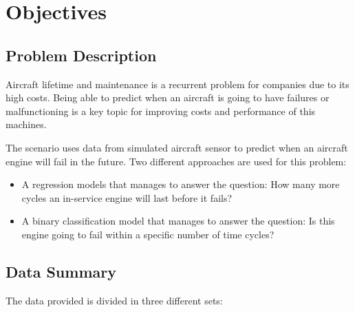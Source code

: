 
\chapter{Objectives} %

\label{Chapter1} %


\newcommand{\keyword}[1]{\textbf{#1}}
\newcommand{\tabhead}[1]{\textbf{#1}}
\newcommand{\code}[1]{\texttt{#1}}
\newcommand{\file}[1]{\texttt{\bfseries#1}}
\newcommand{\option}[1]{\texttt{\itshape#1}}


\section{Problem Description}
Aircraft lifetime and maintenance is a recurrent problem for companies due to its high costs.
Being able to predict when an aircraft is going to have failures or malfunctioning is a key topic for improving costs and performance of this machines.

The scenario uses data from simulated aircraft sensor to predict when an aircraft engine will fail in the future.
Two different approaches are used for this problem:

\begin{itemize}
\item A regression models that manages to answer the question: How many more cycles an in-service engine will last before it fails?
\item A binary classification model that manages to answer the question: Is this engine going to fail within a specific number of time cycles?
\end{itemize}


\section{Data Summary}\label{sec:data-summary}

The data provided is divided in three different sets:

